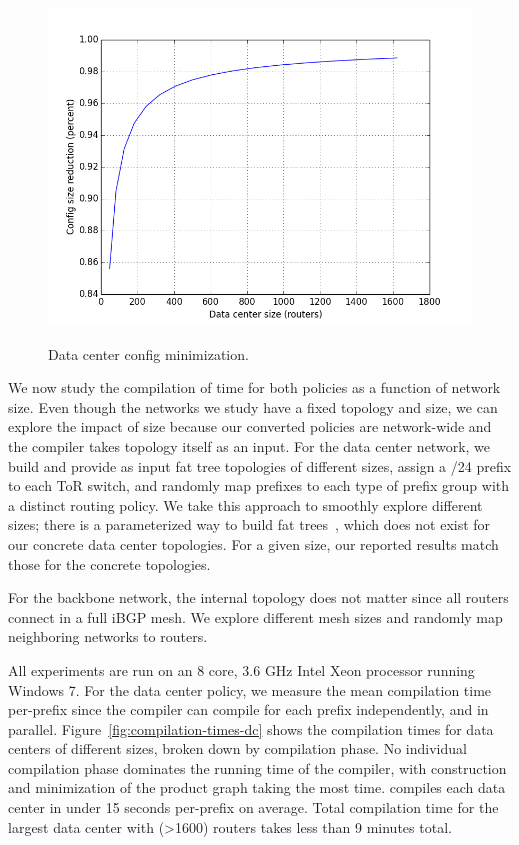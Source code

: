 \begin{figure}[t!]
\centering
\includegraphics[width=\columnwidth]{figures/config-compression-dc.png}
\label{fig:compilation-compression-dc}
\caption{Data center config minimization.}
\end{figure} 

We now study the compilation of time for both policies as a function of network size. Even though the networks we study have a fixed topology and size, we can explore the impact of size because our converted policies are network-wide and the compiler takes topology itself as an input. For the data center network, we build and provide as input fat tree topologies of different sizes, assign a /24 prefix to each ToR switch, and randomly map prefixes to each type of prefix group with a distinct routing policy. We take this approach to smoothly explore different sizes; there is a parameterized way to build fat trees~\cite{fattree}, which does not exist for our concrete data center topologies. For a given size, our reported results match those for the concrete topologies.

For the backbone network, the internal topology does not matter since all routers connect in a full iBGP mesh. We explore different mesh sizes and randomly map neighboring networks to routers.

All experiments are run on an 8 core, 3.6 GHz Intel Xeon processor running Windows 7. 
%
For the data center policy, we measure the mean compilation time per-prefix since the \sysname compiler can compile for each prefix independently, and in parallel. Figure~\ref{fig:compilation-times-dc} shows the compilation times for data centers of different sizes, broken down by compilation phase. No individual compilation phase dominates the running time of the compiler, with construction and minimization of the product graph taking the most time. \sysname compiles each data center in under 15 seconds per-prefix on average. Total compilation time for the largest data center with (>1600) routers takes less than 9 minutes total.

